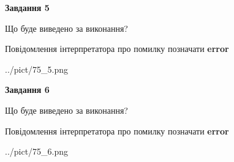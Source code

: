 \documentclass[12pt, ukrainian]{article}
\begin{document}
{{\begin {center}\textbf{Завдання 5}\end {center}}\par
Що буде виведено за виконання? \par
Повідомлення інтерпретатора про помилку позначати \textbf{error}

\begin{center}
	{../pict/75_5.png}
\end{center}
\newpage

{\begin {center}\textbf{Завдання 6}\end {center}}\par
Що буде виведено за виконання? \par
Повідомлення інтерпретатора про помилку позначати \textbf{error}

\begin{center}
	{../pict/75_6.png}
\end{center}
\newpage

}
\end{document}
